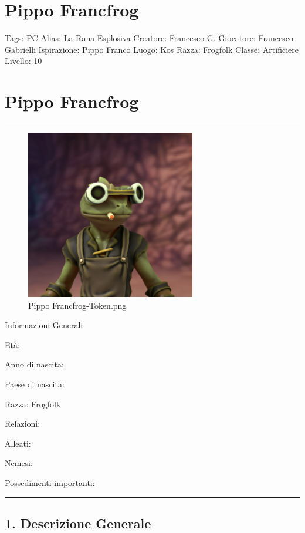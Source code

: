 \section{Pippo Francfrog}\label{pippo-francfrog}

Tags: PC Alias: La Rana Esplosiva Creatore: Francesco G. Giocatore:
Francesco Gabrielli Ispirazione: Pippo Franco Luogo: Kos Razza: Frogfolk
Classe: Artificiere Livello: 10

\section{Pippo Francfrog}\label{pippo-francfrog-1}

\begin{center}\rule{0.5\linewidth}{0.5pt}\end{center}

\begin{figure}
\centering
\includegraphics{Pippo_Francfrog-Token.png}
\caption{Pippo Francfrog-Token.png}
\end{figure}

Informazioni Generali

Età:

Anno di nascita:

Paese di nascita:

Razza: Frogfolk

Relazioni:

Alleati:

Nemesi:

Possedimenti importanti:

\begin{center}\rule{0.5\linewidth}{0.5pt}\end{center}

\subsection{1. Descrizione Generale}\label{descrizione-generale}

